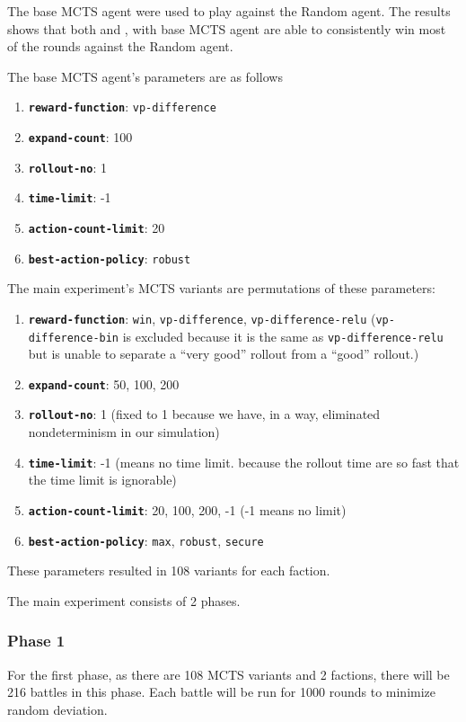 The base MCTS agent were used to play against the Random agent. The results shows that both \Marquise{} and \Eyrie{}, with base MCTS agent are able to consistently win most of the rounds against the Random agent.

The base MCTS agent's parameters are as follows
\begin{enumerate}
    \item \textbf{\texttt{reward-function}}: \texttt{vp-difference}
    \item \textbf{\texttt{expand-count}}: 100
    \item \textbf{\texttt{rollout-no}}: 1
    \item \textbf{\texttt{time-limit}}: -1
    \item \textbf{\texttt{action-count-limit}}: 20
    \item \textbf{\texttt{best-action-policy}}: \texttt{robust}
\end{enumerate}

The main experiment's MCTS variants are permutations of these parameters:
\begin{enumerate}
    \item \textbf{\texttt{reward-function}}: \texttt{win}, \texttt{vp-difference}, \texttt{vp-difference-relu} (\texttt{vp-difference-bin} is excluded because it is the same as \texttt{vp-difference-relu} but is unable to separate a ``very good'' rollout from a ``good'' rollout.)
    \item \textbf{\texttt{expand-count}}: 50, 100, 200
    \item \textbf{\texttt{rollout-no}}: 1 (fixed to 1 because we have, in a way, eliminated nondeterminism in our simulation)
    \item \textbf{\texttt{time-limit}}: -1 (means no time limit. because the rollout time are so fast that the time limit is ignorable)
    \item \textbf{\texttt{action-count-limit}}: 20, 100, 200, -1 (-1 means no limit)
    \item \textbf{\texttt{best-action-policy}}: \texttt{max}, \texttt{robust}, \texttt{secure}
\end{enumerate}
These parameters resulted in 108 variants for each faction.

The main experiment consists of 2 phases.

\subsubsection{Phase 1}
For the first phase, as there are 108 MCTS variants and 2 factions, there will be 216 battles in this phase. Each battle will be run for 1000 rounds to minimize random deviation.

